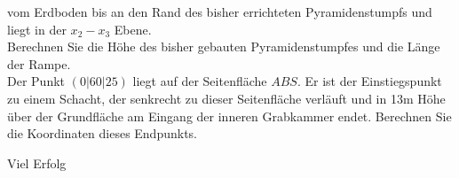 \documentclass[a4paper,12pt]{article}
\begin{document}
\begin{enumerate}[label={\alph*)}]
  vom Erdboden bis an den Rand des bisher errichteten Pyramidenstumpfs und liegt in der $x_2-x_3$ Ebene.\\
    
    Berechnen Sie die Höhe des bisher gebauten Pyramidenstumpfes und die Länge der Rampe.\\

    Der Punkt $(0|60|25)$ liegt auf der Seitenfläche $ABS$. Er ist der Einstiegspunkt zu einem Schacht, der senkrecht zu dieser Seitenfläche verläuft und in 13m Höhe über der Grundfläche am Eingang der inneren Grabkammer endet. Berechnen Sie die Koordinaten dieses Endpunkts.
\end{enumerate}



\centerline{Viel Erfolg}









\end{document}
